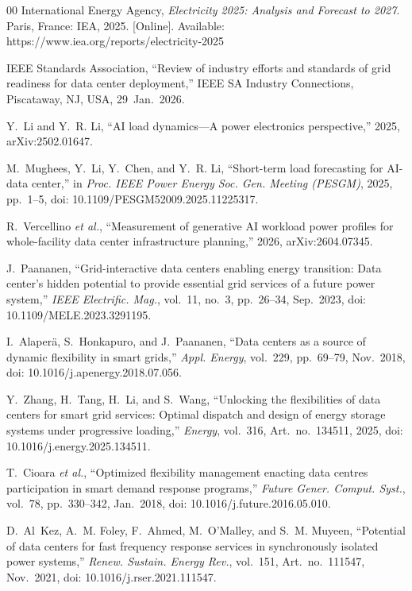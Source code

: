 \documentclass{ieeeaccess}
\begin{document}
\begin{thebibliography}{00}
International Energy Agency, \emph{Electricity 2025: Analysis and Forecast to 2027}. Paris, France: IEA, 2025. [Online]. Available: https://www.iea.org/reports/electricity-2025

IEEE Standards Association, ``Review of industry efforts and standards of grid readiness for data center deployment,'' IEEE SA Industry Connections, Piscataway, NJ, USA, 29~Jan.~2026.

Y.~Li and Y.~R. Li, ``AI load dynamics---A power electronics perspective,'' 2025, arXiv:2502.01647.

M.~Mughees, Y.~Li, Y.~Chen, and Y.~R. Li, ``Short-term load forecasting for AI-data center,'' in \emph{Proc. IEEE Power Energy Soc. Gen. Meeting (PESGM)}, 2025, pp.~1--5, doi: 10.1109/PESGM52009.2025.11225317.

R.~Vercellino \emph{et al.}, ``Measurement of generative AI workload power profiles for whole-facility data center infrastructure planning,'' 2026, arXiv:2604.07345.

J.~Paananen, ``Grid-interactive data centers enabling energy transition: Data center's hidden potential to provide essential grid services of a future power system,'' \emph{IEEE Electrific. Mag.}, vol.~11, no.~3, pp.~26--34, Sep.~2023, doi: 10.1109/MELE.2023.3291195.

I.~Alaper{\"a}, S.~Honkapuro, and J.~Paananen, ``Data centers as a source of dynamic flexibility in smart grids,'' \emph{Appl. Energy}, vol.~229, pp.~69--79, Nov.~2018, doi: 10.1016/j.apenergy.2018.07.056.

Y.~Zhang, H.~Tang, H.~Li, and S.~Wang, ``Unlocking the flexibilities of data centers for smart grid services: Optimal dispatch and design of energy storage systems under progressive loading,'' \emph{Energy}, vol.~316, Art.~no.~134511, 2025, doi: 10.1016/j.energy.2025.134511.

T.~Cioara \emph{et al.}, ``Optimized flexibility management enacting data centres participation in smart demand response programs,'' \emph{Future Gener. Comput. Syst.}, vol.~78, pp.~330--342, Jan.~2018, doi: 10.1016/j.future.2016.05.010.

D.~Al~Kez, A.~M. Foley, F.~Ahmed, M.~O'Malley, and S.~M. Muyeen, ``Potential of data centers for fast frequency response services in synchronously isolated power systems,'' \emph{Renew. Sustain. Energy Rev.}, vol.~151, Art.~no.~111547, Nov.~2021, doi: 10.1016/j.rser.2021.111547.


\end{thebibliography}
\end{document}
